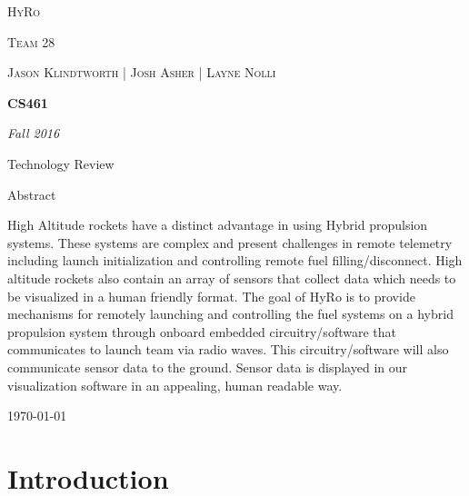 \documentclass[10pt,draftclsnofoot,onecolumn]{IEEEtran}
\begin{document}
\begin{titlepage}
\centering
	{\scshape\LARGE HyRo \par}
	{\scshape\LARGE Team 28\par}
	\vspace{1cm}
	{\scshape\Large Jason Klindtworth  |  Josh Asher  |   Layne Nolli}
	\noindent\makebox[\linewidth]{\rule{17cm}{2pt}}
	\vspace{1cm}
	{\huge\bfseries CS461\par}
	\vspace{2cm}
	{\Large\itshape Fall 2016\par}
	\vspace{4cm}
	{\large Technology Review\par}
	\vspace{4cm}
	{\large Abstract\par}
	\vspace{1cm}
	High Altitude rockets have a distinct advantage in using Hybrid propulsion systems. These systems are complex and present challenges in remote telemetry including launch initialization and controlling remote fuel filling/disconnect. High altitude rockets also contain an array of sensors that collect data which needs to be visualized in a human friendly format. The goal of HyRo is to provide mechanisms for remotely launching and controlling the fuel systems on a hybrid propulsion system through onboard embedded circuitry/software that communicates to launch team via radio waves. This circuitry/software will also communicate sensor data to the ground. Sensor data is displayed in our visualization software in an appealing, human readable way. \par
	\noindent\makebox[\linewidth]{\rule{17cm}{2pt}}

	\vfill

	{\large \today\par}
\end{titlepage}
\tableofcontents

\section{Introduction}
\end{document}
